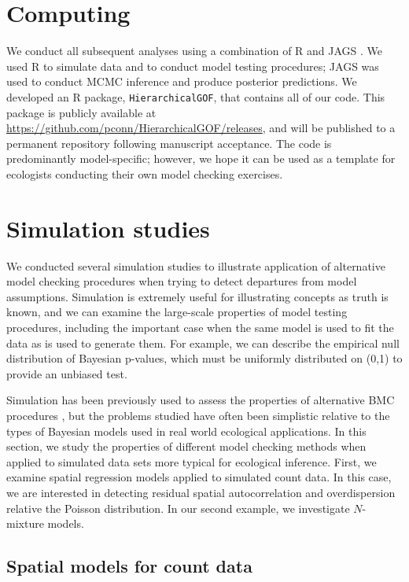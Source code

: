 \documentclass[12pt,english]{article}
\begin{document}
\begin{spacing}{1.9}
\section{Computing}

We conduct all subsequent analyses using a combination of R
\citep{RTeam2015} and JAGS \citep{Plummer2003}.  We used R to simulate
data and to conduct model testing procedures; JAGS was used to conduct
MCMC inference and produce posterior predictions. We developed an R
package, \texttt{HierarchicalGOF}, that contains all of our code.
This package is publicly available at
\url{https://github.com/pconn/HierarchicalGOF/releases}, and will be
published to a permanent repository following manuscript
acceptance. The code is predominantly model-specific; however, we hope
it can be used as a template for ecologists conducting their own model
checking exercises.


\section{Simulation studies}

We conducted several simulation studies to illustrate application of
alternative model checking procedures when trying to detect departures
from model assumptions.  Simulation is extremely useful for
illustrating concepts as truth is known, and we can examine the
large-scale properties of model testing procedures, including the
important case when the same model is used to fit the data as is used
to generate them.  For example, we can describe the empirical null
distribution of Bayesian p-values, which must be uniformly distributed
on (0,1) to provide an unbiased test.

Simulation has been previously used to assess the properties of
alternative BMC procedures
\citep[e.g.,][]{Gosselin2011,YuanJohnson2012,Zhang2014}, but the
problems studied have often been simplistic relative to the types of
Bayesian models used in real world ecological applications.  In this
section, we study the properties of different model checking methods
when applied to simulated data sets more typical for ecological
inference.  First, we examine spatial regression models applied to
simulated count data.  In this case, we are interested in detecting
residual spatial autocorrelation and overdispersion relative the
Poisson distribution.  In our second example, we investigate
$N$-mixture models.

\subsection{Spatial models for count data}


\end{spacing}
\end{document}
